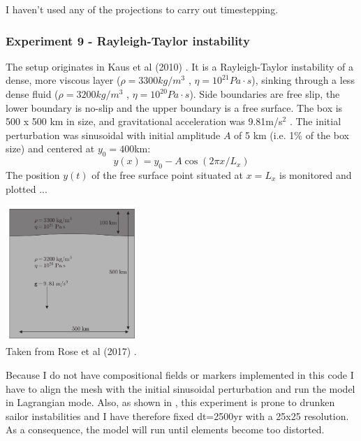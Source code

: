 I haven't used any of the projections to carry out timestepping.



\subsubsection*{Experiment 9 - Rayleigh-Taylor instability}


The setup originates in Kaus et al (2010) \cite{kamm10}.
It is a Rayleigh-Taylor instability of a dense, more viscous 
layer ($\rho=3300kg/m^3$ , $\eta=10^{21}Pa\cdot s$), 
sinking through a less dense fluid ($\rho=3200 kg/m^3$ , $\eta=10^{20}Pa\cdot s$). 
Side boundaries are free slip, the lower boundary is no-slip and the upper boundary 
is a free surface. 
The box is 500 x 500 km in size, and gravitational acceleration was 9.81m/s$^2$ . 
The initial perturbation was sinusoidal with initial amplitude $A$ of 5 km (i.e. 1\%
of the box size) and centered at $y_0=400$km:
\[
y(x)=y_0 - A \cos(2\pi x/L_x)
\]
The position $y(t)$ of the free surface point situated at $x=L_x$ 
is monitored and plotted ...

\begin{center}
\includegraphics[width=5cm]{python_codes/fieldstone_54/images/exp9/robh17}\\
{\captionfont Taken from Rose et al (2017) \cite{robh17}.}
\end{center}

Because I do not have compositional fields or markers implemented in this code I have 
to align the mesh with the initial sinusoidal perturbation and run the model in 
Lagrangian mode. Also, as shown in \cite{kamm10}, this experiment is prone to drunken sailor 
instabilities and I have therefore fixed dt=2500yr with a 25x25 resolution.
As a consequence, the model will run until elements become too distorted. 

